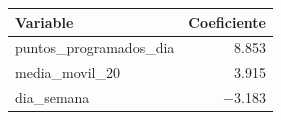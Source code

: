 \begin{tabular}{lr}
\toprule
Variable & Coeficiente \\
\midrule
puntos\_programados\_dia & 8.853 \\
media\_movil\_20 & 3.915 \\
dia\_semana & $-$3.183 \\
\bottomrule
\end{tabular}
